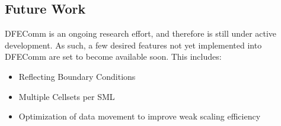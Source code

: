 \documentclass{article}
\begin{document}
\subsection{Future Work} \label{future}
DFEComm is an ongoing research effort, and therefore is still under active development. As such, a few desired features not yet implemented into DFEComm are set to become available soon. This includes:
\begin{itemize}
	\item Reflecting Boundary Conditions
	\item Multiple Cellsets per SML
	\item Optimization of data movement to improve weak scaling efficiency
\end{itemize}

%
\pagebreak

\renewcommand{\bibname}{{\normalsize\rm REFERENCES}}

\end{document}
